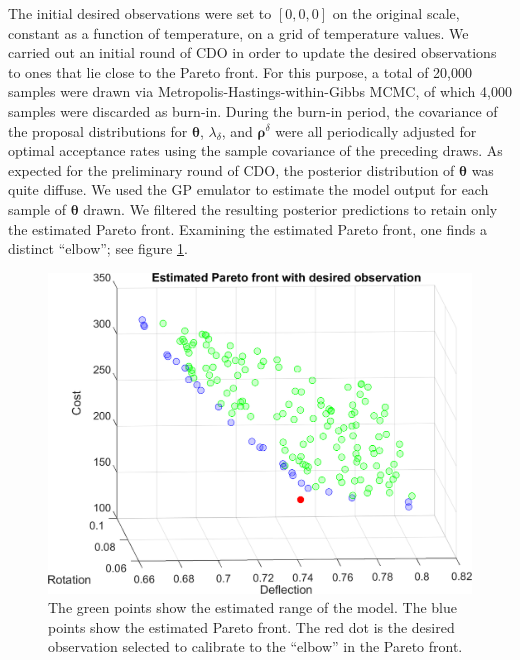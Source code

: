 \documentclass{article}
\begin{document}
The initial desired observations were set to $[0,0,0]$ on the original scale, constant as a function of temperature, on a grid of temperature values.
%
We carried out an initial round of CDO in order to update the desired observations to ones that lie close to the Pareto front.
%
For this purpose, a total of 20,000 samples were drawn via Metropolis-Hastings-within-Gibbs MCMC, of which 4,000 samples were discarded as burn-in. 
%
During the burn-in period, the covariance of the proposal distributions for $\boldsymbol \theta$, $\lambda_\delta$, and $\boldsymbol\rho^\delta$ were all periodically adjusted for optimal acceptance rates using the sample covariance of the preceding draws.
%
%
%
As expected for the preliminary round of CDO, the posterior distribution of $\boldsymbol\theta$ was quite diffuse.
%
We used the GP emulator to estimate the model output for each sample of $\boldsymbol \theta$ drawn.
%
We filtered the resulting posterior predictions to retain only the estimated Pareto front.
%
Examining the estimated Pareto front, one finds a distinct ``elbow''; see figure \ref{fig:elbow}.
%
\begin{figure}
\centering
\includegraphics[scale=0.8]{FIG_est_PF_with_des_obs}
\captionsetup{width=.7\linewidth}
\caption{The green points show the estimated range of the model. The blue points show the estimated Pareto front. The red dot is the desired observation selected to calibrate to the ``elbow'' in the Pareto front.}
\label{fig:elbow}
\end{figure}
\end{document}

